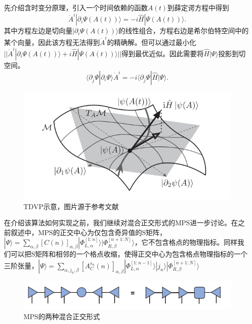 \documentclass[12pt]{article}
\begin{document}
	  先介绍含时变分原理，引入一个时间依赖的函数$A(t)$到薛定谔方程中得到
	  \begin{equation}\dot{A}^i|\partial_i\Psi(A(t))\rangle=-i\hat{H}|\Psi(A(t))\rangle.\end{equation}
	  其中方程左边是切向量$|\partial_i\Psi(A(t))\rangle$的线性组合，方程右边是希尔伯特空间中的某个向量，因此该方程无法得到$\dot{A}^i$的精确解。但可以通过最小化$||\dot{A}^i|\partial_i\Psi(A(t))\rangle+i\hat{H}|\Psi(A(t))\rangle||$得到最优近似。因此需要将$\hat{H}|\Psi\rangle$投影到切空间。
	  \begin{equation}\langle\partial_{\bar{j}}\Psi|\partial_i\Psi\rangle\dot{A}^i=-i\langle\partial_{\bar{j}}\Psi|\hat{H}|\Psi\rangle.\end{equation}
	  \begin{figure}[H]
	  	\centering
	  	\includegraphics[scale=0.8]{11.TDVP示意}
	  	\caption[9pt]{ TDVP示意，图片源于参考文献}
	  	\label{fig:11}
	  \end{figure}
	  在介绍该算法如何实现之前，我们继续对混合正交形式的MPS进一步讨论。在之前叙述中，MPS的正交中心为仅包含奇异值的S矩阵，$|\Psi\rangle=\sum_{\alpha,\beta}[C(n)]_{\alpha,\beta}|\Phi_{L,\alpha}^{[1:n]}\rangle|\Phi_{R,\beta}^{[n+1:N]}\rangle$，它不包含格点的物理指标。同样我们可以把S矩阵和相邻的一个格点收缩，使得正交中心为包含格点物理指标的一个三阶张量，$|\Psi\rangle=\sum_{\alpha,j_n,\beta}[A_C^{s_n}(n)]_{\alpha,\beta}|\Phi_{L,\alpha}^{[1:n-1]}\rangle|j_n\rangle|\Phi_{R,\beta}^{[n+1:N]}\rangle$
	  \begin{figure}[H]
	  	\centering
	  	\includegraphics[scale=0.7]{12.MPS的两种混合正交形式}
	  	\caption[9pt]{ MPS的两种混合正交形式}
	  	\label{fig:12}
	  \end{figure}
      
\end{document}
